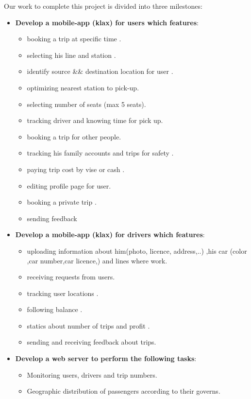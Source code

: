Our work to complete this project is divided into three milestones:
\begin{itemize}

\item \textbf{Develop a mobile-app (klax) for users which features}:
    \begin{itemize}
    \item booking a trip at specific time .
    \item selecting his line and station .
    \item identify source && destination location for user .
    \item optimizing nearest station to pick-up. 
    \item selecting number of seats (max 5 seats).
    \item tracking driver and knowing time for pick up.
    \item booking a trip for other people.
    \item tracking his family accounts and trips for safety .
    \item paying trip cost by vise or cash .
    \item editing profile page for user.
    \item booking a private trip .
    \item sending feedback
    \end{itemize}
\item \textbf{Develop a mobile-app (klax) for drivers which features}:
    \begin{itemize}
        \item uploading information about him(photo, licence, address,..) ,his car (color ,car number,car licence,) and lines where work.
        \item receiving requests from users.
        \item tracking user locations .
        \item following balance .
        \item statics about number of trips and profit .
        \item sending and receiving feedback about trips.
    \end{itemize}
\item \textbf{Develop a web server to perform the following tasks}:
    \begin{itemize}
    \item Monitoring users, drivers and trip numbers.
    \item Geographic distribution of passengers according to their governs.

\end{itemize}
\end{itemize}
